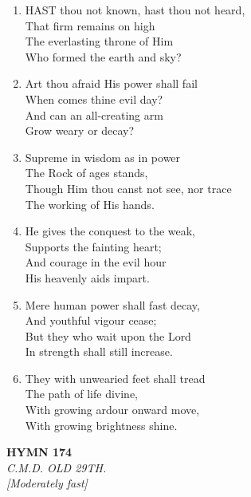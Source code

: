 \documentclass[11pt,a4paper]{article}
\begin{document}
\begin{enumerate}
    \item HAST thou not known, hast thou not heard, \\
        That firm remains on high \\
        The everlasting throne of Him \\
        Who formed the earth and sky?

    \item Art thou afraid His power shall fail \\
        When comes thine evil day? \\
        And can an all-creating arm \\
        Grow weary or decay?

    \item Supreme in wisdom as in power \\
        The Rock of ages stands, \\
        Though Him thou canst not see, nor trace \\
        The working of His hands.

    \item He gives the conquest to the weak, \\
        Supports the fainting heart; \\
        And courage in the evil hour \\
        His heavenly aids impart.

    \item Mere human power shall fast decay, \\
        And youthful vigour cease; \\
        But they who wait upon the Lord \\
        In strength shall still increase.

    \item They with unwearied feet shall tread \\
        The path of life divine, \\
        With growing ardour onward move, \\
        With growing brightness shine.

\end{enumerate}

\newpage
\begin{center}
    {\Large \textbf{HYMN 174}}
    \\
    \textit{C.M.D. OLD 29TH.}
    \\
    \textit{\small [Moderately fast]}
\end{center}
\vspace{1em}
\end{document}
